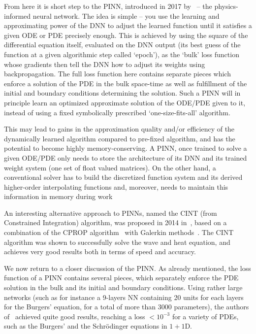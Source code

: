 \documentclass{article}
\begin{document}
From here it is short step to the PINN, introduced in 2017 by~\cite{raissi2017physics_1,raissi2017physics_2} -- the physics-informed neural network. The idea is simple -- you use the learning and approximating power of the DNN to adjust the learned function until it satisfies a given ODE or PDE precisely enough. This is achieved by using the square of the differential equation itself, evaluated on the DNN output (its best guess of the function at a given algorithmic step called `epoch'), as the `bulk' loss function whose gradients then tell the DNN how to adjust its weights using backpropagation. The full loss function here contains separate pieces which enforce a solution of the PDE in the bulk space-time as well as fulfillment of the initial and boundary conditions determining the solution. Such a PINN will in principle learn an optimized approximate solution of the ODE/PDE given to it, instead of using a fixed symbolically prescribed `one-size-fits-all' algorithm. 

This may lead to gains in the approximation quality and/or efficiency of the dynamically learned algorithm compared to pre-fixed algorithm, and has the potential to become highly memory-conserving. A PINN, once trained to solve a given ODE/PDE only needs to store the architecture of its DNN and its trained weight system (one set of float valued matrices). On the other hand, a conventional solver has to build the discretized function system and its derived higher-order interpolating functions and, moreover, needs to maintain this information in memory during work 

An interesting alternative approach to PINNs, named the CINT (from Constrained Integration) algorithm, was proposed in 2014 in~\cite{rudd2013constrained, RUDD2015277}, based on a combination of the CPROP algorithm~\cite{ferrari2008} with Galerkin methods~\cite{galerkin1915electrical, michlin1962variationsmethoden, vajnberg1973variational}.  The CINT algorithm was shown to successfully solve the wave and heat equation, and achieves very good results both in terms of speed and accuracy. 

We now return to a closer discussion of the PINN. As already mentioned, the loss function of a PINN contains several pieces, which separately enforce the PDE solution in the bulk and its initial and boundary conditions. Using rather large networks (such as for instance a 9-layers NN containing 20 units for each layers for the Burgers' equation, for a total of more than 3000 parameters), the authors of~\cite{raissi2017physics_1} achieved quite good results, reaching a loss $< 10^{-3}$ for a variety of PDEs, such as the Burgers'  and the Schr\"odinger equations in $1+1$D. 
\end{document}
